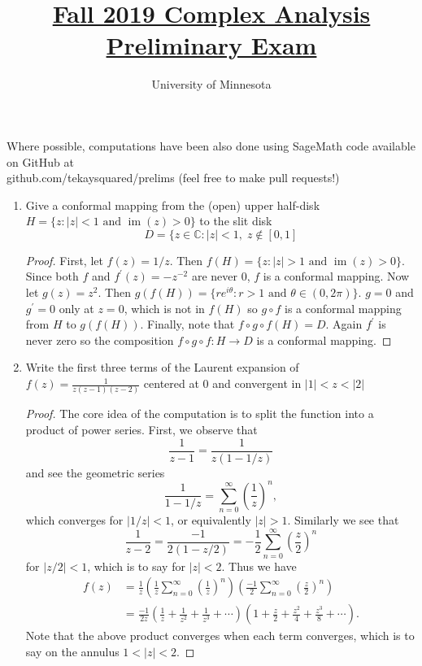 \documentclass{article}
\title{\href{https://math.umn.edu/sites/math.umn.edu/files/exams/complexf19.pdf}{Fall 2019 Complex Analysis Preliminary Exam}}
\author{University of Minnesota}
\date{}
\DeclareMathOperator{\im}{im}
\begin{document}
\maketitle

Where possible, computations have been also done using SageMath code available on GitHub at \\ github.com/tekaysquared/prelims (feel free to make pull requests!)

\begin{enumerate}
	\item Give a conformal mapping from the (open) upper half-disk $H = \{z : |z|<1 \text{ and } \im(z) > 0\}$ to the slit disk
	\[D = \{ z \in \mathbb{C} : |z|< 1,\;z \not \in [0,1] \]
	
	\begin{proof}
		First, let $f(z) = 1/z$. Then $f(H) = \{ z : |z|>1 \text{ and } \im(z) > 0 \}$. Since both $f$ and $f^\prime(z) = -z^{-2}$ are never $0$, 
		$f$ is a conformal mapping.
		Now let $g(z) = z^2$. Then $g(f(H)) = \{ re^{i \theta} : r > 1 \text{ and } \theta \in (0, 2\pi) \}$. 
		$g=0$ and $g^\prime = 0$ only at $z = 0$, which is not in $f(H)$ so $g \circ f$ is a conformal mapping from $H$ to $g(f(H))$.
		Finally, note that $f \circ g \circ f(H) = D$. 
		Again $f^\prime$ is never zero so the composition $f \circ g \circ f : H \rightarrow D$ is a conformal mapping.
	\end{proof}



	\setcounter{enumi}{1}
	
	\item Write the first three terms of the Laurent expansion of $\displaystyle f(z) = \frac{1}{z(z-1)(z-2)}$ centered at $0$ and convergent in $|1| < z < |2|$
	
	\begin{proof}
		The core idea of the computation is to split the function into a product of power series.
		First, we observe that 
		\[ \frac{1}{z-1} = \frac{1}{z(1-1/z)}\] 
		and see the geometric series 
		\[ \frac{1}{1-1/z} = \sum_{n=0}^\infty \left( \frac{1}{z} \right)^n,\]
		which converges for $|1/z| < 1$, or equivalently $|z|>1$.
		Similarly we see that 
		\[ \frac{1}{z-2} = \frac{-1}{2(1-z/2)} = -\frac{1}{2} \sum_{n=0}^\infty \left ( \frac{z}{2} \right )^n \]
		for $|z/2| < 1$, which is to say for $|z|< 2$.
		Thus we have
		\begin{align*}
			f(z) &= \frac{1}{z} \left ( \frac{1}{z} \sum_{n=0}^\infty \left ( \frac{1}{z} \right )^n \right ) \left ( \frac{-1}{2} \sum_{n=0}^\infty \left( \frac{z}{2} \right)^n \right )\\
			&= \frac{-1}{2z} \left (\frac{1}{z} + \frac{1}{z^2} + \frac{1}{z^3} + \cdots  \right) \left ( 1 + \frac{z}{2}+\frac{z^2}{4}+\frac{z^3}{8}+\cdots \right ).
		\end{align*}
		Note that the above product converges when each term converges, which is to say on the annulus $1 < |z| < 2$.
	

\end{proof}
\end{enumerate}
\end{document}
